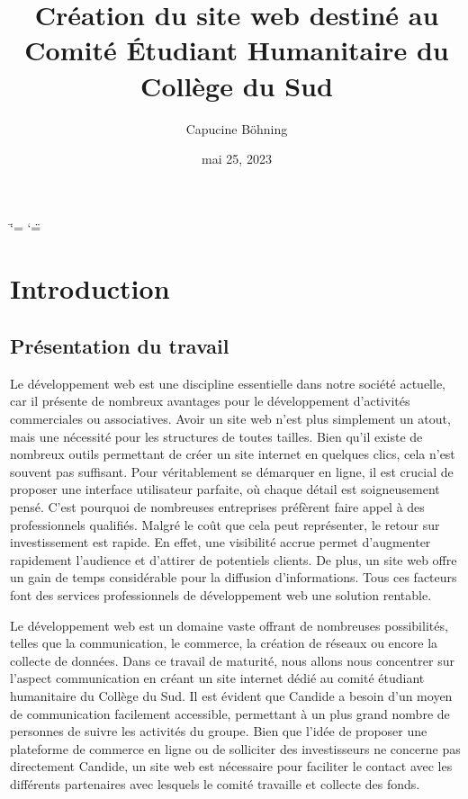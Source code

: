 \documentclass[a4,10pt,french]{sphinxmanual}
\title{Création du site web destiné au Comité Étudiant Humanitaire du Collège du Sud}
\date{mai 25, 2023}
\author{Capucine Böhning}
\begin{document}
\ifdefined\shorthandoff
  \ifnum\catcode`\=\string=\active\shorthandoff{=}\fi
  \ifnum\catcode`\"=\active{}\fi
\fi

\pagestyle{empty}
\sphinxmaketitle
\pagestyle{plain}
\sphinxtableofcontents
\pagestyle{normal}
\label{\detokenize{index::doc}}



\chapter{Introduction}
\label{\detokenize{introduction:introduction}}\label{\detokenize{introduction::doc}}

\section{Présentation du travail}
\label{\detokenize{introduction:presentation-du-travail}}
\sphinxAtStartPar
Le développement web est une discipline essentielle dans notre société actuelle, car il présente de nombreux avantages pour le développement d’activités commerciales ou associatives. Avoir un site web n’est plus simplement un atout, mais une nécessité pour les structures de toutes tailles. Bien qu’il existe de nombreux outils permettant de créer un site internet en quelques clics, cela n’est souvent pas suffisant. Pour véritablement se démarquer en ligne, il est crucial de proposer une interface utilisateur parfaite, où chaque détail est soigneusement pensé. C’est pourquoi de nombreuses entreprises préfèrent faire appel à des professionnels qualifiés. Malgré le coût que cela peut représenter, le retour sur investissement est rapide. En effet, une visibilité accrue permet d’augmenter rapidement l’audience et d’attirer de potentiels clients. De plus, un site web offre un gain de temps considérable pour la diffusion d’informations. Tous ces facteurs font des services professionnels de développement web une solution rentable.

\sphinxAtStartPar
Le développement web est un domaine vaste offrant de nombreuses possibilités, telles que la communication, le commerce, la création de réseaux ou encore la collecte de données. Dans ce travail de maturité, nous allons nous concentrer sur l’aspect communication en créant un site internet dédié au comité étudiant humanitaire du Collège du Sud. Il est évident que Candide a besoin d’un moyen de communication facilement accessible, permettant à un plus grand nombre de personnes de suivre les activités du groupe. Bien que l’idée de proposer une plateforme de commerce en ligne ou de solliciter des investisseurs ne concerne pas directement Candide, un site web est nécessaire pour faciliter le contact avec les différents partenaires avec lesquels le comité travaille et collecte des fonds.
\end{document}
